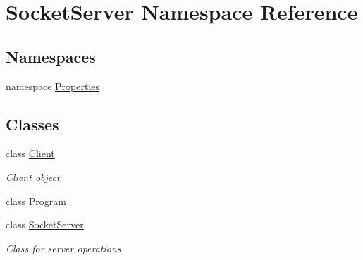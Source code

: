 \hypertarget{namespace_socket_server}{}\section{Socket\+Server Namespace Reference}
\label{namespace_socket_server}
\subsection*{Namespaces}
\begin{DoxyCompactItemize}
\item 
namespace \hyperlink{namespace_socket_server_1_1_properties}{Properties}
\end{DoxyCompactItemize}
\subsection*{Classes}
\begin{DoxyCompactItemize}
\item 
class \hyperlink{class_socket_server_1_1_client}{Client}
\begin{DoxyCompactList}\small\item\em \hyperlink{class_socket_server_1_1_client}{Client} object \end{DoxyCompactList}\item 
class \hyperlink{class_socket_server_1_1_program}{Program}
\item 
class \hyperlink{class_socket_server_1_1_socket_server}{Socket\+Server}
\begin{DoxyCompactList}\small\item\em Class for server operations \end{DoxyCompactList}\end{DoxyCompactItemize}
